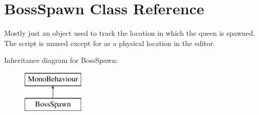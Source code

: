 \hypertarget{class_boss_spawn}{}\section{Boss\+Spawn Class Reference}
\label{class_boss_spawn}


Mostly just an object used to track the location in which the queen is spawned. The script is unused except for as a physical location in the editor.  


Inheritance diagram for Boss\+Spawn\+:\begin{figure}[H]
\begin{center}
\leavevmode
\includegraphics[height=2.000000cm]{class_boss_spawn}
\end{center}
\end{figure}

